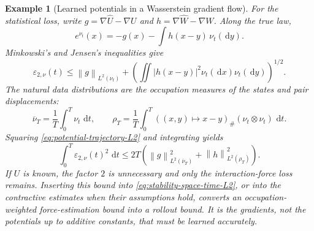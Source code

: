 \documentclass[11pt]{amsart}
\numberwithin{equation}{section}
\theoremstyle{plain}
\newtheorem{example}[theorem]{Example}
\newcommand{\dd}{\,\mathrm{d}}
\newcommand{\abs}[1]{\left\lvert#1\right\rvert}
\newcommand{\norm}[1]{\left\lVert#1\right\rVert}
\begin{document}
\begin{example}[Learned potentials in a Wasserstein gradient flow]
For the statistical loss, write
$g=\nabla\widehat U-\nabla U$ and
$h=\nabla\widehat W-\nabla W$.  Along the true law,
\[
 e^{\nu_t}(x)=-g(x)-\int h(x-y)\,\nu_t(\dd y).
\]
Minkowski's and Jensen's inequalities give
\begin{equation}\label{eq:potential-trajectory-L2}
 \varepsilon_{2,\nu}(t)
 \leq \norm g_{L^2(\nu_t)}
 +\left(\iint\abs{h(x-y)}^2\nu_t(\dd x)\nu_t(\dd y)\right)^{1/2}.
\end{equation}
The natural data distributions are the occupation measures of the states
and pair displacements:
\[
 \overline\nu_T=\frac1T\int_0^T\nu_t\,\dd t,\qquad
 \rho_T=\frac1T\int_0^T
       ((x,y)\mapsto x-y)_\#(\nu_t\otimes\nu_t)\,\dd t.
\]
Squaring \eqref{eq:potential-trajectory-L2} and integrating yields
\begin{equation}\label{eq:potential-occupation-L2}
 \int_0^T\varepsilon_{2,\nu}(t)^2\,\dd t
 \leq 2T\left(\norm g_{L^2(\overline\nu_T)}^2
                      +\norm h_{L^2(\rho_T)}^2\right).
\end{equation}
If $U$ is known, the factor $2$ is unnecessary and only the interaction-force
loss remains.  Inserting this bound into
\eqref{eq:stability-space-time-L2}, or into the contractive estimates when
their assumptions hold, converts an occupation-weighted force-estimation
bound into a rollout bound.  It is the gradients, not the potentials up to
additive constants, that must be learned accurately.
\end{example}
\end{document}
